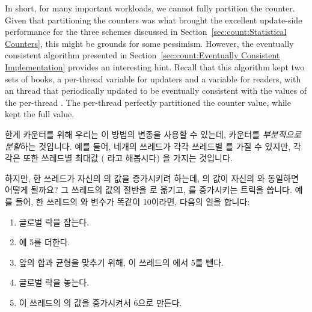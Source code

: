 \begin{lineref}
In short, for many important workloads, we cannot fully partition the counter.
Given that partitioning the counters was what brought the excellent
update-side performance for the three schemes discussed in
Section~\ref{sec:count:Statistical Counters}, this might be grounds
for some pessimism.
However, the eventually consistent algorithm presented in
Section~\ref{sec:count:Eventually Consistent Implementation}
provides an interesting hint.
Recall that this algorithm kept two sets of books, a
per-thread  variable for updaters and a 
variable for readers, with an  thread that periodically
updated  to be eventually consistent with the values
of the per-thread .
The per-thread  perfectly partitioned the counter value, while
 kept the full value.
\fi

한계 카운터를 위해 우리는 이 방법의 변종을 사용할 수 있는데, 카운터를
\emph{부분적으로 분할}하는 것입니다.
예를 들어, 네개의 쓰레드가 각각 쓰레드별  를 가질 수 있지만, 각각은
또한 쓰레드별 최대값 ( 라고 해봅시다) 을 가지는 것입니다.

하지만, 한 쓰레드가 자신의  의 값을 증가시키려 하는데, 
의 값이 자신의  와 동일하면 어떻게 될까요?
그 쓰레드의  값의 절반을  로 옮기고, 
를 증가시키는 트릭을 씁니다.
예를 들어, 한 쓰레드의  와  변수가 똑같이 10이라면,
다음의 일을 합니다:

\begin{enumerate}
\item	글로벌 락을 잡는다.
\item	{} 에 5를 더한다.
\item	앞의 합과 균형을 맞추기 위해, 이 쓰레드의  에서 5를 뺀다.
\item	글로벌 락을 놓는다.
\item	이 쓰레드의  의 값을 증가시켜서 6으로 만든다.
\iffalse


\end{enumerate}
\end{lineref}
